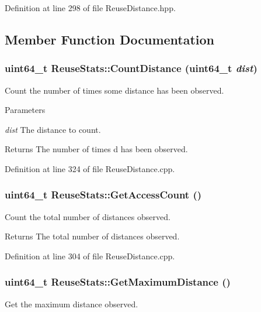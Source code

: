 Definition at line 298 of file ReuseDistance.hpp.



\subsection{Member Function Documentation}
\hypertarget{class_reuse_stats_abdb92b77ec7191be80e77a34f894e11b}{
\subsubsection[{CountDistance}]{\setlength{\rightskip}{0pt plus 5cm}uint64\_\-t ReuseStats::CountDistance (uint64\_\-t {\em dist})}}
\label{class_reuse_stats_abdb92b77ec7191be80e77a34f894e11b}
Count the number of times some distance has been observed.


\begin{DoxyParams}{Parameters}
\item[{\em dist}]The distance to count.\end{DoxyParams}
\begin{DoxyReturn}{Returns}
The number of times d has been observed. 
\end{DoxyReturn}


Definition at line 324 of file ReuseDistance.cpp.

\hypertarget{class_reuse_stats_a48935d131ce635b1b37b2a43f0c52217}{
\subsubsection[{GetAccessCount}]{\setlength{\rightskip}{0pt plus 5cm}uint64\_\-t ReuseStats::GetAccessCount ()}}
\label{class_reuse_stats_a48935d131ce635b1b37b2a43f0c52217}
Count the total number of distances observed.

\begin{DoxyReturn}{Returns}
The total number of distances observed. 
\end{DoxyReturn}


Definition at line 304 of file ReuseDistance.cpp.

\hypertarget{class_reuse_stats_ac70175a532ea2dc608e0fd2f04e4fcbb}{
\subsubsection[{GetMaximumDistance}]{\setlength{\rightskip}{0pt plus 5cm}uint64\_\-t ReuseStats::GetMaximumDistance ()}}
\label{class_reuse_stats_ac70175a532ea2dc608e0fd2f04e4fcbb}
Get the maximum distance observed.

